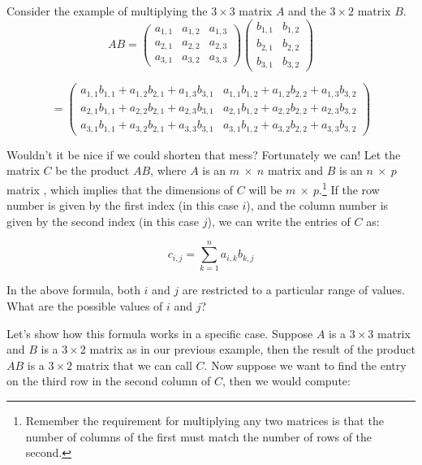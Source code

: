  Consider the example of multiplying the $3 \times 3$ matrix $A$ and the $3 \times 2$ matrix $B$. 
\[{A}{B} = \left( \begin{array}{ccc}
a_{1,1} & a_{1,2}  & a_{1,3}  \\
a_{2,1} & a_{2,2} & a_{2,3} \\
a_{3,1} & a_{3,2} & a_{3,3} \end{array} \right)
 \left( \begin{array}{cc}
b_{1,1} & b_{1,2}    \\
b_{2,1} & b_{2,2}  \\
b_{3,1} & b_{3,2}  \end{array} \right) \]

\[= \left( \begin{array}{cc}
a_{1,1} b_{1,1} + a_{1,2} b_{2,1} + a_{1,3} b_{3,1} & a_{1,1} b_{1,2} + a_{1,2} b_{2,2} + a_{1,3} b_{3,2}  \\
a_{2,1} b_{1,1} + a_{2,2} b_{2,1} + a_{2,3} b_{3,1} & a_{2,1} b_{1,2} + a_{2,2} b_{2,2} + a_{2,3} b_{3,2}  \\
a_{3,1} b_{1,1} + a_{3,2} b_{2,1} + a_{3,3} b_{3,1} & a_{3,1} b_{1,2} + a_{3,2} b_{2,2} + a_{3,3} b_{3,2}  \end{array} \right) \]

Wouldn't it be nice if we could shorten that mess?  Fortunately we can!  Let the matrix ${C}$ be the product ${A} {B}$, where ${A}$ is an $m ~\times ~n$ matrix  and ${B}$ is an $n ~\times ~p$ matrix , which implies that the dimensions of ${C}$ will be $m ~ \times ~ p$.\footnote{Remember the requirement for multiplying any two matrices is that the number of columns of the first must match the number of rows of the second.}  If the row number is given by the first index (in this case $i$), and the column number is given by the second index (in this case $j$), we can write the entries of  ${C}$ as: 

\[ {c}_{i,j}= \sum_{k=1}^n a_{i,k} b_{k,j} \]


\begin{exercise}{}
In the above formula, both $i$ and $j$ are restricted to a particular range of values.  
What are the possible values of $i$ and $j$?
\end{exercise} 

Let's show how this formula works in a specific case. Suppose ${A}$ is a $3 \times 3$ matrix and ${B}$ is a $3 \times 2$ matrix as in our previous example, then the result of the product ${A} {B}$ is a $3 \times 2 $ matrix that we can call ${C}$.  Now suppose we want to find the entry on the third row in the second column of ${C}$, then we would compute:

